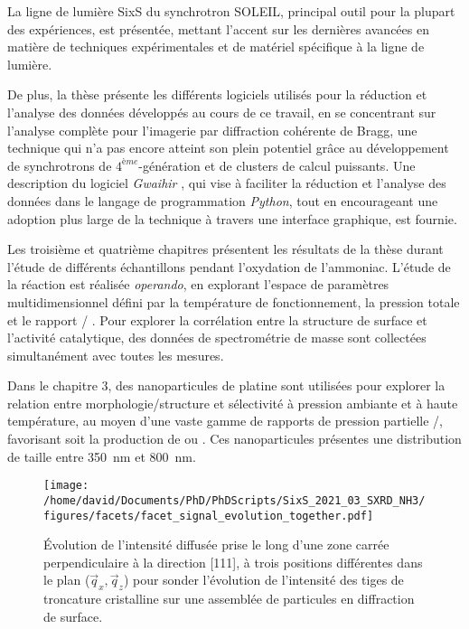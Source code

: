 La ligne de lumière SixS du synchrotron SOLEIL, principal outil pour la plupart des expériences, est présentée, mettant l'accent sur les dernières avancées en matière de techniques expérimentales et de matériel spécifique à la ligne de lumière.

De plus, la thèse présente les différents logiciels utilisés pour la réduction et l'analyse des données développés au cours de ce travail, en se concentrant sur l'analyse complète pour l'imagerie par diffraction cohérente de Bragg, une technique qui n'a pas encore atteint son plein potentiel grâce au développement de synchrotrons de $4^{ème}$-génération et de clusters de calcul puissants.
Une description du logiciel \textit{Gwaihir} \parencite{Simonne2022}, qui vise à faciliter la réduction et l'analyse des données dans le langage de programmation \textit{Python}, tout en encourageant une adoption plus large de la technique à travers une interface graphique, est fournie.

Les troisième et quatrième chapitres présentent les résultats de la thèse durant l'étude de différents échantillons pendant l'oxydation de l'ammoniac.
L'étude de la réaction est réalisée \textit{operando}, en explorant l'espace de paramètres multidimensionnel défini par la température de fonctionnement, la pression totale et le rapport  / .
Pour explorer la corrélation entre la structure de surface et l'activité catalytique, des données de spectrométrie de masse sont collectées simultanément avec toutes les mesures.

Dans le chapitre 3, des nanoparticules de platine sont utilisées pour explorer la relation entre morphologie/structure et sélectivité à pression ambiante et à haute température, au moyen d'une vaste gamme de rapports de pression partielle /, favorisant soit la production de  ou .
Ces nanoparticules présentes une distribution de taille entre \qty{350}{\nm} et \qty{800}{\nm}.

\begin{figure}[!htb]
    \centering
    \texttt{[image: /home/david/Documents/PhD/PhDScripts/SixS\_2021\_03\_SXRD\_NH3/figures/facets/facet\_signal\_evolution\_together.pdf]}
    \caption{
    Évolution de l'intensité diffusée prise le long d'une zone carrée perpendiculaire à la direction [111], à trois positions différentes dans le plan ($\vec{q}_x, \vec{q}_z$) pour sonder l'évolution de l'intensité des tiges de troncature cristalline sur une assemblée de particules en diffraction de surface.
    }
    \label{fig:FacetSignalFr}
\end{figure}

